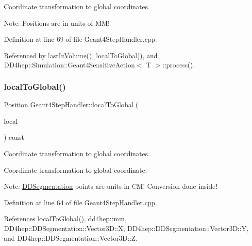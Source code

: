 Coordinate transformation to global coordinates. 

Note\+: Positions are in units of M\+M! 

Definition at line 69 of file Geant4\+Step\+Handler.\+cpp.



Referenced by last\+In\+Volume(), local\+To\+Global(), and D\+D4hep\+::\+Simulation\+::\+Geant4\+Sensitive\+Action$<$ T $>$\+::process().

\hypertarget{class_d_d4hep_1_1_simulation_1_1_geant4_step_handler_ab778e17a1f7038772c91d128c680f65b}{}\label{class_d_d4hep_1_1_simulation_1_1_geant4_step_handler_ab778e17a1f7038772c91d128c680f65b} 
\subsubsection{\texorpdfstring{local\+To\+Global()}{localToGlobal()}\hspace{0.1cm}{\footnotesize\ttfamily [2/4]}}
{\footnotesize\ttfamily \hyperlink{namespace_d_d4hep_1_1_geometry_a55083902099d03506c6db01b80404900}{Position} Geant4\+Step\+Handler\+::local\+To\+Global (\begin{DoxyParamCaption}\item[{const \hyperlink{struct_d_d4hep_1_1_d_d_segmentation_1_1_vector3_d}{D\+D\+Segmentation\+::\+Vector3D} \&}]{local }\end{DoxyParamCaption}) const}



Coordinate transformation to global coordinates. 

Coordinate transformation to global coordinate.

Note\+: \hyperlink{namespace_d_d4hep_1_1_d_d_segmentation}{D\+D\+Segmentation} points are units in C\+M! Conversion done inside! 

Definition at line 64 of file Geant4\+Step\+Handler.\+cpp.



References local\+To\+Global(), dd4hep\+::mm, D\+D4hep\+::\+D\+D\+Segmentation\+::\+Vector3\+D\+::X, D\+D4hep\+::\+D\+D\+Segmentation\+::\+Vector3\+D\+::Y, and D\+D4hep\+::\+D\+D\+Segmentation\+::\+Vector3\+D\+::Z.

\hypertarget{class_d_d4hep_1_1_simulation_1_1_geant4_step_handler_a9ea78bcf920fa47e9bbb84a71f91acfa}{}\label{class_d_d4hep_1_1_simulation_1_1_geant4_step_handler_a9ea78bcf920fa47e9bbb84a71f91acfa} 
